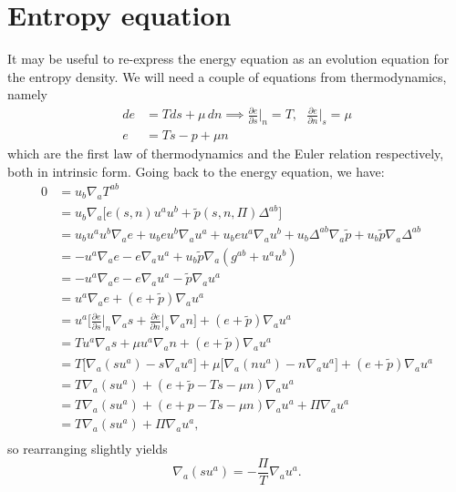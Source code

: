 \documentclass[12pt]{article}
\numberwithin{equation}{section}
\begin{document}
\section{Entropy equation}

It may be useful to re-express the energy equation as an evolution equation for the entropy density.
We will need a couple of equations from thermodynamics, namely
\begin{align}
d e &= T ds + \mu \, d n \implies \frac{\partial e}{\partial s} \Big|_n = T, ~~~ \frac{\partial e}{\partial n} \Big|_s = \mu \label{eq:first_law} \\
e &= T s - p + \mu n \label{eq:Euler_relation}
\end{align}
which are the first law of thermodynamics and the Euler relation respectively, both in intrinsic form.
Going back to the energy equation, we have:
\begin{equation}
\begin{aligned}
0 &= u_b \nabla_{a} T^{ab} \\
&= u_b \nabla_{a} \Big[ e(s, n) u^a u^b + \tilde{p}(s, n, \Pi) \Delta^{ab} \Big] \\
&= u_b u^a u^b \nabla_{a} e + u_b e u^b \nabla_{a} u^a + u_b e u^a \nabla_{a} u^b + u_b \Delta^{ab} \nabla_{a} \tilde{p} + u_b \tilde{p} \nabla_{a} \Delta^{ab} \\
&= - u^a \nabla_{a} e - e \nabla_{a} u^a + u_b \tilde{p} \nabla_{a} (g^{ab} + u^a u^b) \\
&= - u^a \nabla_{a} e - e \nabla_{a} u^a - \tilde{p} \nabla_{a} u^a \\
&= u^a \nabla_{a} e  + (e + \tilde{p}) \nabla_{a} u^a \\
&= u^a \Big[ \frac{\partial e}{\partial s} \Big|_n \nabla_{a} s + \frac{\partial e}{\partial n} \Big|_s \nabla_a n \Big]  + (e + \tilde{p}) \nabla_{a} u^a \\
&= T u^a \nabla_{a} s + \mu u^a \nabla_a n  + (e + \tilde{p}) \nabla_{a} u^a \\
&= T \big[ \nabla_a (s u^a) - s \nabla_a u^a \big] + \mu \big[ \nabla_a (n u^a) - n \nabla_a u^a \big]  + (e + \tilde{p}) \nabla_{a} u^a \\
&= T \nabla_a (s u^a) + (e + \tilde{p} - T s - \mu n) \nabla_{a} u^a \\
&= T \nabla_a (s u^a) + (e + p - T s - \mu n) \nabla_{a} u^a + \Pi \nabla_a u^a \\
&= T \nabla_a (s u^a) + \Pi \nabla_a u^a, \\
\end{aligned}
\end{equation}
so rearranging slightly yields
\begin{equation} \label{eq:entropy_eqn}
\boxed{ \nabla_a (s u^a) = - \frac{\Pi}{T} \nabla_a u^a. }
\end{equation}
\end{document}

